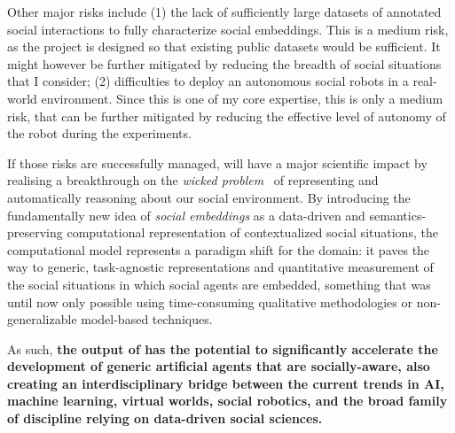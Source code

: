 Other major risks include (1) the lack of sufficiently large datasets of
annotated social interactions to fully characterize social embeddings. This is a
medium risk, as the project is designed so that existing public datasets would
be sufficient. It might however be further mitigated by reducing the breadth of
social situations that I consider; (2) difficulties to deploy an autonomous
social robots in a real-world environment. Since this is one of my core
expertise, this is only a medium risk, that can be further mitigated by reducing
the effective level of autonomy of the robot during the experiments.

If those risks are successfully managed, \project will have a major scientific
impact by realising a breakthrough on the \emph{wicked
problem}~\cite{west1967wicked} of representing and automatically reasoning about
our social environment.  By introducing the fundamentally new idea of
\emph{social embeddings} as a data-driven and semantics-preserving computational
representation of contextualized social situations, the \project computational
model represents a paradigm shift for the domain: it paves the way to generic,
task-agnostic representations and quantitative measurement of the social
situations in which social agents are embedded, something that was until now
only possible using time-consuming qualitative methodologies or
non-generalizable model-based techniques.

\begin{framed}
As such, \bf the output of \project has the potential to significantly
accelerate the development of generic artificial agents that are socially-aware,
also creating an interdisciplinary bridge between the current trends in AI, machine
learning, virtual worlds, social robotics, and the broad family of discipline relying on
data-driven social sciences.
\end{framed}


\newpage

\printbibliography



